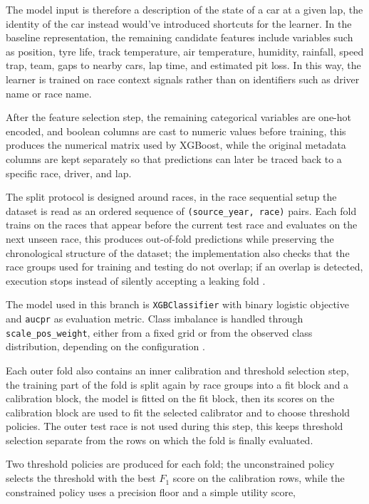 The model input is therefore a description of the state of a car at a given lap, the identity of the car instead would've introduced shortcuts for the learner.
In the baseline representation, the remaining candidate features
include variables such as position, tyre life, track temperature, air temperature, humidity, rainfall, speed trap, team, gaps to nearby cars, lap time, and estimated pit loss.
In this way, the learner is trained on race context signals rather than on identifiers such as driver name or race name.

After the feature selection step, the remaining categorical variables are one-hot encoded, and boolean columns are cast to numeric values before training, this produces the numerical
matrix used by XGBoost, while the original metadata columns are kept separately so that predictions can later be traced back to a specific race, driver, and lap.

The split protocol is designed around races, in the race sequential setup the dataset is read as an ordered sequence of \texttt{(source\_year, race)}
pairs. Each fold trains on the races that appear before the current test race and evaluates on the next unseen race, this produces out-of-fold predictions while preserving
the chronological structure of the dataset; the implementation also checks that the race groups used for training and testing do not overlap; if an overlap is detected,
execution stops instead of silently accepting a leaking fold \cite{roberts2017cvstructured}.

The model used in this branch is \texttt{XGBClassifier} with binary logistic objective and \texttt{aucpr} as evaluation metric. Class imbalance is handled through
\texttt{scale\_pos\_weight}, either from a fixed grid or from the observed class distribution, depending on the configuration \cite{chen2016xgboost,he2009imbalanced}.

Each outer fold also contains an inner calibration and threshold selection step, the training part of the fold is split again by race groups into a fit block and a
calibration block, the model is fitted on the fit block, then its scores on the calibration block are used to fit the selected calibrator and to choose threshold policies.
The outer test race is not used during this step, this keeps threshold selection separate from the rows on which the fold is finally evaluated.

Two threshold policies are produced for each fold; the unconstrained policy selects the threshold with the best $F_1$ score on the calibration rows, while the constrained policy
uses a precision floor and a simple utility score,

